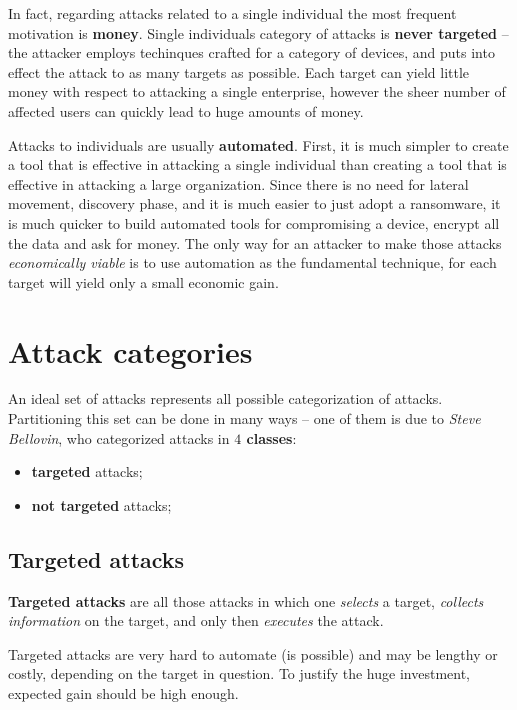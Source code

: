 \documentclass[10pt]{extbook}
\begin{document}
In fact, regarding attacks related to a single individual the most frequent
motivation is \textbf{money}. Single individuals category of attacks is
\textbf{never targeted} -- the attacker employs techinques crafted for a category
of devices, and puts into effect the attack to as many targets as possible.
Each target can yield little money with respect to attacking a single
enterprise, however the sheer number of affected users can quickly lead to huge
amounts of money.

Attacks to individuals are usually \textbf{automated}. First, it is much
simpler to create a tool that is effective in attacking a single individual
than creating a tool that is effective in attacking a large organization. Since
there is no need for lateral movement, discovery phase, and it is much easier
to just adopt a ransomware, it is much quicker to build automated tools for
compromising a device, encrypt all the data and ask for money. The only way for
an attacker to make those attacks \emph{economically viable} is to use
automation as the fundamental technique, for each target will yield only a small
economic gain.

\section{Attack categories}

An ideal set of attacks represents all possible categorization of attacks.
Partitioning this set can be done in many ways -- one of them is due to
\emph{Steve Bellovin}, who categorized attacks in \textbf{$4$ classes}:
\begin{itemize}
    \item \textbf{targeted} attacks;
    \item \textbf{not targeted} attacks;
\end{itemize}

\subsection{Targeted attacks}

\textbf{Targeted attacks} are all those attacks in which one \emph{selects} a
target, \emph{collects information} on the target, and only then
\emph{executes} the attack.

Targeted attacks are very hard to automate (is possible) and may be lengthy or
costly, depending on the target in question. To justify the huge investment,
expected gain should be high enough.
\end{document}
